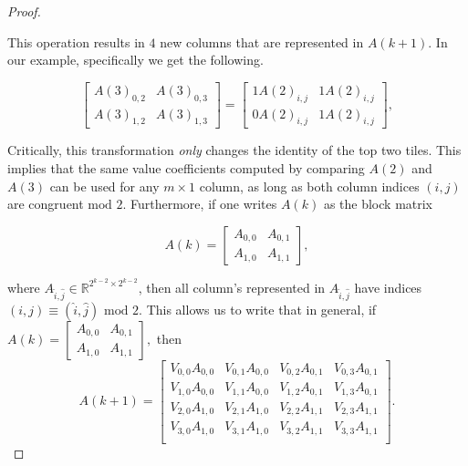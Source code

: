 \documentclass[12pt]{article}
\theoremstyle{plain}
\theoremstyle{definition}
\theoremstyle{remark}
\theoremstyle{definition}
\newcommand{\lablnode}[3]{\node[shape=circle,draw=none,fill=none, inner sep=0pt,minimum size=5pt] (A) at ( #1 , #2 ) {#3};}
\begin{document}
\begin{proof}
\begin{center}
\end{center}

This operation results in $4$ new columns that are represented in $A(k+1)$. In our example, specifically we get the following. 

$$
\begin{bmatrix} 
    A(3)_{0,2} & A(3)_{0,3} \\ 
    A(3)_{1,2} & A(3)_{1,3} 
\end{bmatrix} = 
\begin{bmatrix} 
    1A(2)_{i,j} & 1A(2)_{i,j} \\ 
    0A(2)_{i,j} & 1A(2)_{i,j} 
\end{bmatrix},
$$

Critically, this transformation \textit{only} changes the identity of the top two tiles. This implies that the same value coefficients computed by comparing $A(2)$ and $A(3)$ can be used for any $m \times 1$ column, as long as both column indices $(i,j)$ are congruent $\text{mod } 2$. Furthermore, if one writes $A(k)$ as the block matrix

$$A(k) = \begin{bmatrix} A_{0,0} & A_{0,1} \\ A_{1,0} & A_{1,1} \end{bmatrix},$$

where $A_{\hat{i},\hat{j}} \in \mathbb{R}^{2^{k-2} \times 2^{k-2}}$, then all column's represented in $A_{\hat{i},\hat{j}}$ have indices $(i,j) \equiv (\hat{i},\hat{j}) \text{ mod } 2$. This allows us to write that in general, if $A(k) = \begin{bmatrix} A_{0,0} & A_{0,1} \\ A_{1,0} & A_{1,1} \end{bmatrix},$
then
$$A(k+1) = 
\begin{bmatrix}
    V_{0,0}A_{0,0} & V_{0,1}A_{0,0} & V_{0,2}A_{0,1} & V_{0,3}A_{0,1} \\
    V_{1,0}A_{0,0} & V_{1,1}A_{0,0} & V_{1,2}A_{0,1} & V_{1,3}A_{0,1} \\
    V_{2,0}A_{1,0} & V_{2,1}A_{1,0} & V_{2,2}A_{1,1} & V_{2,3}A_{1,1} \\
    V_{3,0}A_{1,0} & V_{3,1}A_{1,0} & V_{3,2}A_{1,1} & V_{3,3}A_{1,1} \\
\end{bmatrix}.
$$


\end{proof}
\end{document}
